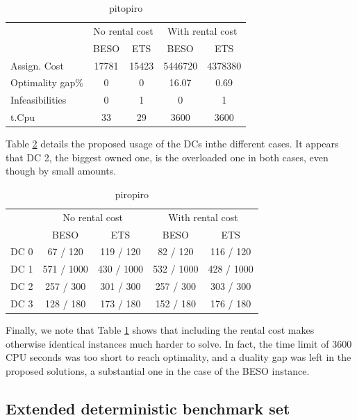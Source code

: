 \documentclass[ijoc,sglanonrev]{informs4}
\begin{document}
\begin{table}
\centering
\begin{tabular}{l|cc|cc|}
& \multicolumn{2}{|c|}{No rental cost} & \multicolumn{2}{|c|}{With rental cost} \\
                 & BESO  & ETS   & BESO    & ETS     \\
\hline
Assign. Cost     & 17781 & 15423 & 5446720 & 4378380 \\
Optimality gap\% & 0     & 0     & 16.07   & 0.69    \\
Infeasibilities  & 0     & 1     & 0       & 1       \\
t.Cpu            & 33    & 29    & 3600    & 3600    \\
\hline
\end{tabular}
\caption{pitopiro}
\label{table:compETS}
\end{table}

Table \ref{table:resETS} details the proposed usage of the  DCs inthe different cases. It appears that DC 2, the biggest owned one, is the overloaded one in both cases, even though by small amounts. 

\begin{table}
\centering
\begin{tabular}{l|cc|cc|}
& \multicolumn{2}{|c|}{No rental cost} & \multicolumn{2}{|c|}{With rental cost} \\
                 & BESO  & ETS   & BESO    & ETS     \\
\hline
DC 0 & 67 / 120 & 119 / 120 & 82 / 120 & 116 / 120 \\
DC 1 & 571 / 1000 & 430 / 1000 & 532 / 1000 & 428 / 1000 \\
DC 2 & 257 / 300 & 301 / 300 & 257 / 300 & 303 / 300 \\
DC 3 & 128 / 180 & 173 / 180 & 152 / 180 & 176 / 180 \\
\hline
\end{tabular}
\caption{piropiro}
\label{table:resETS}
\end{table}

Finally, we note that Table \ref{table:compETS} shows that including the rental cost makes otherwise identical instances much harder to solve. In fact, the time limit of 3600 CPU seconds was too short to reach optimality, and a duality gap was left in the proposed solutions, a substantial one in the case of the BESO instance.

\subsection{Extended deterministic benchmark set} \label{Subsec:extend}
\end{document}
